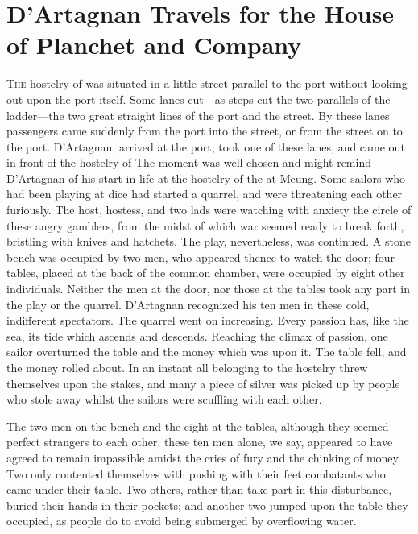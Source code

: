 \chapter{D'Artagnan Travels for the House of Planchet and Company}

\lettrine{T}{he} hostelry of  was situated in a little street parallel to the port without looking out upon the port itself. Some lanes cut—as steps cut the two parallels of the ladder—the two great straight lines of the port and the street. By these lanes passengers came suddenly from the port into the street, or from the street on to the port. D'Artagnan, arrived at the port, took one of these lanes, and came out in front of the hostelry of  The moment was well chosen and might remind D'Artagnan of his start in life at the hostelry of the  at Meung. Some sailors who had been playing at dice had started a quarrel, and were threatening each other furiously. The host, hostess, and two lads were watching with anxiety the circle of these angry gamblers, from the midst of which war seemed ready to break forth, bristling with knives and hatchets. The play, nevertheless, was continued. A stone bench was occupied by two men, who appeared thence to watch the door; four tables, placed at the back of the common chamber, were occupied by eight other individuals. Neither the men at the door, nor those at the tables took any part in the play or the quarrel. D'Artagnan recognized his ten men in these cold, indifferent spectators. The quarrel went on increasing. Every passion has, like the sea, its tide which ascends and descends. Reaching the climax of passion, one sailor overturned the table and the money which was upon it. The table fell, and the money rolled about. In an instant all belonging to the hostelry threw themselves upon the stakes, and many a piece of silver was picked up by people who stole away whilst the sailors were scuffling with each other.

The two men on the bench and the eight at the tables, although they seemed perfect strangers to each other, these ten men alone, we say, appeared to have agreed to remain impassible amidst the cries of fury and the chinking of money. Two only contented themselves with pushing with their feet combatants who came under their table. Two others, rather than take part in this disturbance, buried their hands in their pockets; and another two jumped upon the table they occupied, as people do to avoid being submerged by overflowing water.

